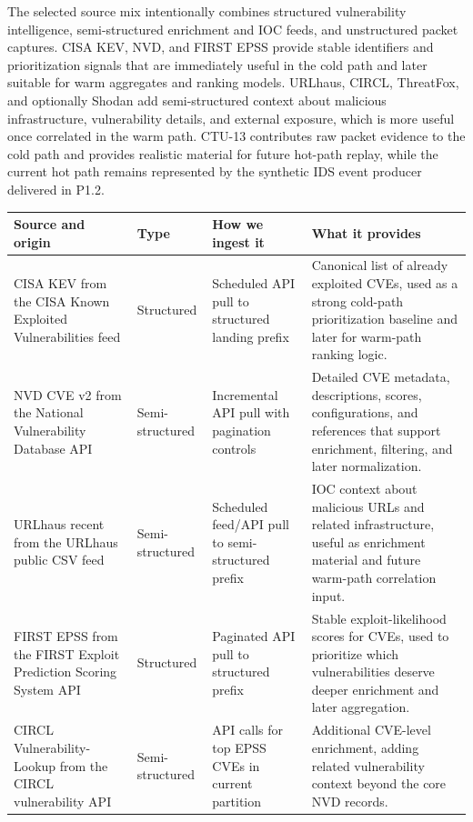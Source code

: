 \documentclass[11pt,a4paper]{article}
\begin{document}
The selected source mix intentionally combines structured vulnerability intelligence, semi-structured enrichment and IOC feeds, and unstructured packet captures. CISA KEV, NVD, and FIRST EPSS provide stable identifiers and prioritization signals that are immediately useful in the cold path and later suitable for warm aggregates and ranking models. URLhaus, CIRCL, ThreatFox, and optionally Shodan add semi-structured context about malicious infrastructure, vulnerability details, and external exposure, which is more useful once correlated in the warm path. CTU-13 contributes raw packet evidence to the cold path and provides realistic material for future hot-path replay, while the current hot path remains represented by the synthetic IDS event producer delivered in P1.2.

\renewcommand{\arraystretch}{1.2}
\begin{tabularx}{\textwidth}{>{\raggedright\arraybackslash}p{4.0cm} >{\raggedright\arraybackslash}p{2.0cm} >{\raggedright\arraybackslash}p{3.0cm} >{\raggedright\arraybackslash}X}
\toprule
\textbf{Source and origin} & \textbf{Type} & \textbf{How we ingest it} & \textbf{What it provides} \\
\midrule
CISA KEV from the CISA Known Exploited Vulnerabilities feed & Structured & Scheduled API pull to structured landing prefix & Canonical list of already exploited CVEs, used as a strong cold-path prioritization baseline and later for warm-path ranking logic. \\
NVD CVE v2 from the National Vulnerability Database API & Semi-structured & Incremental API pull with pagination controls & Detailed CVE metadata, descriptions, scores, configurations, and references that support enrichment, filtering, and later normalization. \\
URLhaus recent from the URLhaus public CSV feed & Semi-structured & Scheduled feed/API pull to semi-structured prefix & IOC context about malicious URLs and related infrastructure, useful as enrichment material and future warm-path correlation input. \\
FIRST EPSS from the FIRST Exploit Prediction Scoring System API & Structured & Paginated API pull to structured prefix & Stable exploit-likelihood scores for CVEs, used to prioritize which vulnerabilities deserve deeper enrichment and later aggregation. \\
CIRCL Vulnerability-Lookup from the CIRCL vulnerability API & Semi-structured & API calls for top EPSS CVEs in current partition & Additional CVE-level enrichment, adding related vulnerability context beyond the core NVD records. \\

\end{tabularx}
\end{document}
